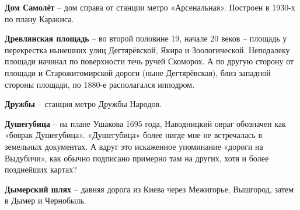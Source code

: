 \medskip

\textbf{Дом Самолёт} – дом справа от станции метро «Арсенальная». Построен в 1930-х по плану Каракиса.\\

\medskip

\textbf{Древлянская площадь} – во второй половине 19, начале 20 веков – площадь у перекрестка нынешних улиц Дегтярёвской, Якира и Зоологической. Неподалеку площади начинал по поверхности течь ручей Скоморох. А по другую сторону от площади и Старожитомирской дороги (ныне Дегтярёвская), близ западной стороны площади, по 1880-е располагался ипподром.\\

\medskip

\textbf{Дружбы} – станция метро Дружбы Народов.\\

\medskip

\textbf{Душегубица} – на плане Ушакова 1695 года, Наводницкий овраг обозначен как «боярак Душегубица». «Душегубица» более нигде мне не встречалась в земельных документах. А вдруг это искаженное упоминание «дороги на Выдубичи», как обычно подписано примерно там на других, хотя и более позднейших картах?\\

\medskip

\textbf{Дымерский шлях} – давняя дорога из Киева через Межигорье, Вышгород, затем в Дымер и Чернобыль.

